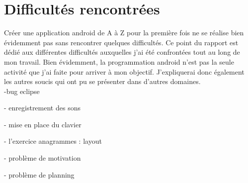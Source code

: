 \section{Difficultés rencontrées\label{diff}}
Créer une application android de A à Z pour la première fois ne se réalise bien évidemment pas sans rencontrer quelques difficultés. Ce point du rapport est dédié aux différentes difficultés auxquelles j'ai été confrontées tout au long de mon travail. Bien évidemment, la programmation android n'est pas la seule activité que j'ai faite pour arriver à mon objectif. J'expliquerai donc également les autres soucis qui ont pu se présenter dans d'autres domaines.\\

-bug eclipse

- enregistrement des sons

- mise en place du clavier

- l'exercice anagrammes : layout

- problème de motivation

- problème de planning